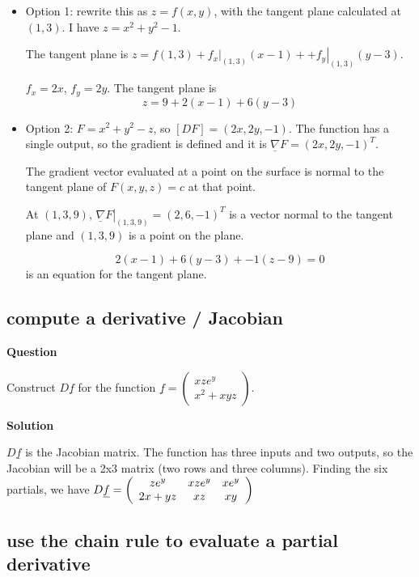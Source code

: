 \documentclass[12pt,letterpaper,noanswers]{exam}
\newcommand{\mb}[1]{\underline{#1}}
\begin{document}
\begin{itemize}
    \item Option 1: rewrite this as $z = f(x,y)$, with the tangent plane calculated at $(1,3)$. I have $z = x^2+y^2 -1$.  
    
    The tangent plane is $z = f(1,3) + \left. f_x\right\vert_{(1,3)}(x-1) + + \left. f_y\right\vert_{(1,3)}(y-3)$.
    
    $f_x = 2x$, $f_y = 2y$.  The tangent plane is
    \[z = 9 + 2(x-1) + 6(y-3)\]
    \item Option 2: $F = x^2 + y^2 - z$, so $[DF] = (2x, 2y, -1)$.  The function has a single output, so the gradient is defined and it is $\mb{\nabla}F = (2x, 2y, -1)^T$.  
    
    The gradient vector evaluated at a point on the surface is normal to the tangent plane of $F(x,y,z) = c$ at that point.
    
    At $(1,3,9)$, $\left.\mb{\nabla}F\right\vert_{(1,3,9)} = (2, 6, -1)^T$ is a vector normal to the tangent plane and $(1,3,9)$ is a point on the plane.
    
    \[2(x-1) + 6(y-3) + -1(z-9) = 0\] is an equation for the tangent plane.
\end{itemize}


\subsection{compute a derivative / Jacobian}

\noindent\textbf{Question}

Construct $D \mb{f}$ for the function $\displaystyle\mb{f} =  \left(\begin{array}{c}xze^y \\ x^2 + xyz \end{array}\right)$.

\noindent\textbf{Solution}

$D \mb{f}$ is the Jacobian matrix.  The function has three inputs and two outputs, so the Jacobian will be a 2x3 matrix (two rows and three columns).  Finding the six partials, we have $D\mb{f} = \left(\begin{array}{c c c}ze^y & x z e^y & xe^y \\ 2x + yz & xz & xy \end{array}\right)$

\subsection{use the chain rule to evaluate a partial derivative}
\end{document}
